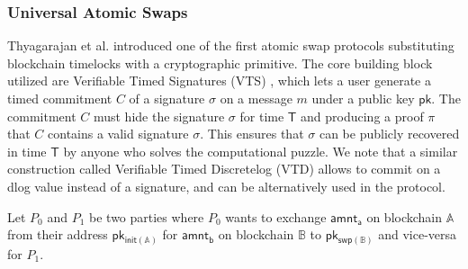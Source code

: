 \documentclass{article}      	%
\begin{document}
%

\subsubsection{Universal Atomic Swaps}


Thyagarajan et al. \cite{uas} introduced one of the first atomic swap protocols substituting blockchain timelocks with a cryptographic primitive. 
The core building block utilized are Verifiable Timed Signatures (VTS) \cite{vts}, which lets a user generate a timed commitment $C$ of a signature $\sigma$ on a message $m$ under a public key $\mathsf{pk}$. The commitment $C $ must hide the signature $\sigma$ for time $\mathsf{T}$ and producing a proof $\pi$ that $C$ contains a valid signature $\sigma$. This ensures that $\sigma$ can be publicly recovered in time $\mathsf{T}$ by anyone who solves the computational puzzle. We note that a similar construction called Verifiable Timed Discretelog (VTD) allows to commit on a dlog value instead of a signature, and can be alternatively used in the protocol.

Let $P_0$ and $P_1$ be two parties where $P_0$ wants to exchange $\mathsf{amnt_a}$ on blockchain $\mathbb{A}$ from their address $\mathsf{pk_{init(\mathbb{A})}}$ for $\mathsf{amnt_b}$ on blockchain $\mathbb{B}$ to $\mathsf{pk_{swp(\mathbb{B})}}$ and vice-versa for $P_1$.
\end{document}
